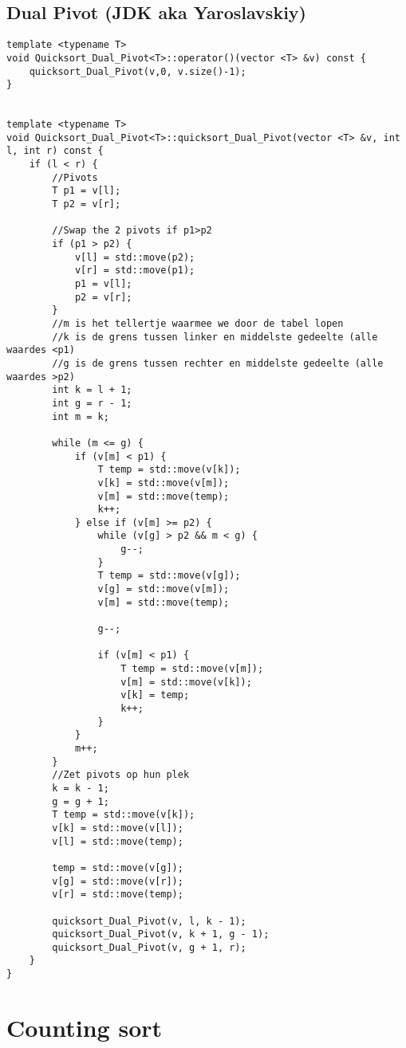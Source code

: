 \documentclass[a4paper]{article}
\begin{document}
\subsection*{Dual Pivot (JDK aka Yaroslavskiy)}
\begin{lstlisting}
template <typename T>
void Quicksort_Dual_Pivot<T>::operator()(vector <T> &v) const {
    quicksort_Dual_Pivot(v,0, v.size()-1);
}


template <typename T>
void Quicksort_Dual_Pivot<T>::quicksort_Dual_Pivot(vector <T> &v, int l, int r) const {
    if (l < r) {
        //Pivots
        T p1 = v[l];
        T p2 = v[r];

        //Swap the 2 pivots if p1>p2
        if (p1 > p2) {
            v[l] = std::move(p2);
            v[r] = std::move(p1);
            p1 = v[l];
            p2 = v[r];
        }
		//m is het tellertje waarmee we door de tabel lopen
		//k is de grens tussen linker en middelste gedeelte (alle waardes <p1)
		//g is de grens tussen rechter en middelste gedeelte (alle waardes >p2)
        int k = l + 1;
        int g = r - 1;
        int m = k;

        while (m <= g) {
            if (v[m] < p1) {
                T temp = std::move(v[k]);
                v[k] = std::move(v[m]);
                v[m] = std::move(temp);
                k++;
            } else if (v[m] >= p2) {
                while (v[g] > p2 && m < g) {
                    g--;
                }
                T temp = std::move(v[g]);
                v[g] = std::move(v[m]);
                v[m] = std::move(temp);

                g--;

                if (v[m] < p1) {
                    T temp = std::move(v[m]);
                    v[m] = std::move(v[k]);
                    v[k] = temp;
                    k++;
                }
            }
            m++;
        }
        //Zet pivots op hun plek
        k = k - 1;
        g = g + 1;
        T temp = std::move(v[k]);
        v[k] = std::move(v[l]);
        v[l] = std::move(temp);

        temp = std::move(v[g]);
        v[g] = std::move(v[r]);
        v[r] = std::move(temp);

        quicksort_Dual_Pivot(v, l, k - 1);
        quicksort_Dual_Pivot(v, k + 1, g - 1);
        quicksort_Dual_Pivot(v, g + 1, r);
    }
}
\end{lstlisting}
\newpage


\newpage

\section{Counting sort}
\end{document}
